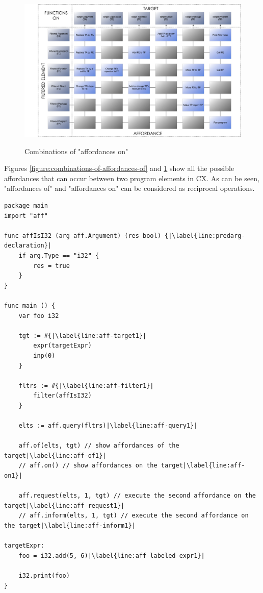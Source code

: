 \documentclass[11pt,fleqn,openany]{book} %
\begin{document}
\begin{figure}
\caption{Combinations of "affordances on"}
\centering
\includegraphics[width=1.0\textwidth]{img/functions-on.png}
\label{figure:combinations-of-affordances-on}
\end{figure}

Figures \ref{figure:combinations-of-affordances-of} and \ref{figure:combinations-of-affordances-on} show all the possible affordances that can occur between two program elements in CX. As can be seen, "affordances of" and "affordances on" can be considered as reciprocal operations.

\clearpage

\begin{lstlisting}[caption={Using affordances on an expression},captionpos=b,label={listing:affordances-example1}]
package main
import "aff"

func affIsI32 (arg aff.Argument) (res bool) {|\label{line:predarg-declaration}|
	if arg.Type == "i32" {
		res = true
	}
}

func main () {
	var foo i32
	
	tgt := #{|\label{line:aff-target1}|
		expr(targetExpr)
		inp(0)
	}

	fltrs := #{|\label{line:aff-filter1}|
		filter(affIsI32)
	}
	
	elts := aff.query(fltrs)|\label{line:aff-query1}|

	aff.of(elts, tgt) // show affordances of the target|\label{line:aff-of1}|
	// aff.on() // show affordances on the target|\label{line:aff-on1}|
	
	aff.request(elts, 1, tgt) // execute the second affordance on the target|\label{line:aff-request1}|
	// aff.inform(elts, 1, tgt) // execute the second affordance on the target|\label{line:aff-inform1}|

targetExpr:
	foo = i32.add(5, 6)|\label{line:aff-labeled-expr1}|

	i32.print(foo)
}
\end{lstlisting}
\end{document}
